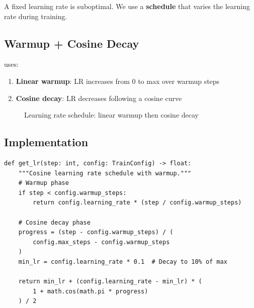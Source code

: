 A fixed learning rate is suboptimal. We use a \textbf{schedule} that varies the learning rate during training.

\subsection{Warmup + Cosine Decay}

\TryLM uses:
\begin{enumerate}
    \item \textbf{Linear warmup}: LR increases from 0 to max over warmup steps
    \item \textbf{Cosine decay}: LR decreases following a cosine curve
\end{enumerate}

\begin{figure}[H]
\centering
{}
\caption{Learning rate schedule: linear warmup then cosine decay}
\label{fig:lr-schedule}
\end{figure}

\subsection{Implementation}

\begin{lstlisting}[style=python, caption={LR schedule from trainer.py}]
def get_lr(step: int, config: TrainConfig) -> float:
    """Cosine learning rate schedule with warmup."""
    # Warmup phase
    if step < config.warmup_steps:
        return config.learning_rate * (step / config.warmup_steps)

    # Cosine decay phase
    progress = (step - config.warmup_steps) / (
        config.max_steps - config.warmup_steps
    )
    min_lr = config.learning_rate * 0.1  # Decay to 10% of max

    return min_lr + (config.learning_rate - min_lr) * (
        1 + math.cos(math.pi * progress)
    ) / 2
\end{lstlisting}

